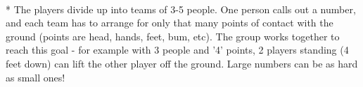 \begin{minipage}{\textwidth}
\\*
The players divide up into teams of 3-5 people.  One person calls out a number, and each team has to arrange for only that many points of contact with the ground (points are head, hands, feet, bum, etc).  The group works together to reach this goal - for example with 3 people and '4' points, 2 players standing (4 feet down) can lift the other player off the ground.  Large numbers can be as hard as small ones!
\end{minipage}    \vfill
